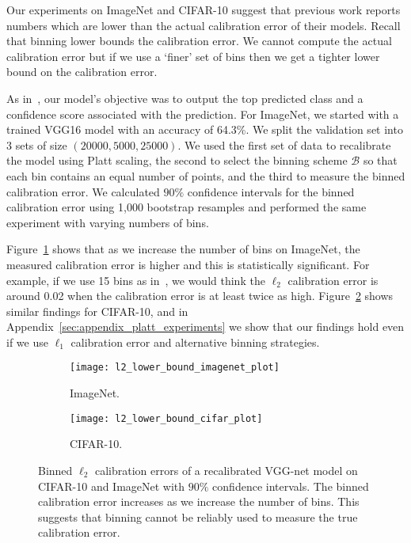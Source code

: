 Our experiments on ImageNet and CIFAR-10 suggest that previous work reports numbers which are lower than the actual calibration error of their models. Recall that binning lower bounds the calibration error. We cannot compute the actual calibration error but if we use a `finer' set of bins then we get a tighter lower bound on the calibration error.

As in~\cite{guo2017calibration}, our model's objective was to output the top predicted class and a confidence score associated with the prediction. For ImageNet, we started with a trained VGG16 model with an accuracy of 64.3\%. We split the validation set into 3 sets of size $(20000, 5000, 25000)$. We used the first set of data to recalibrate the model using Platt scaling, the second to select the binning scheme $\mathcal{B}$ so that each bin contains an equal number of points, and the third to measure the binned calibration error. We calculated $90\%$ confidence intervals for the binned calibration error using 1,000 bootstrap resamples and performed the same experiment with varying numbers of bins.

Figure~\ref{fig:imagenet_lower_bound} shows that as we increase the number of bins on ImageNet, the measured calibration error is higher and this is statistically significant. For example, if we use 15 bins as in~\cite{guo2017calibration}, we would think the $\ell_2$ calibration error is around 0.02 when the calibration error is at least twice as high. Figure~\ref{fig:cifar_10_lower_bound} shows similar findings for CIFAR-10, and in Appendix~\ref{sec:appendix_platt_experiments} we show that our findings hold even if we use $\ell_1$ calibration error and alternative binning strategies.

\begin{figure}
     \centering
     \begin{subfigure}[b]{0.4\textwidth}
         \centering
         \texttt{[image: l2\_lower\_bound\_imagenet\_plot]}
         \caption{ImageNet.}
         \label{fig:imagenet_lower_bound}
     \end{subfigure}
     \hfill
     \begin{subfigure}[b]{0.4\textwidth}
         \centering
         \texttt{[image: l2\_lower\_bound\_cifar\_plot]}
         \caption{CIFAR-10.}
         \label{fig:cifar_10_lower_bound}
     \end{subfigure}
        \caption{
        Binned $\ell_2$ calibration errors of a recalibrated VGG-net model on CIFAR-10 and ImageNet with $90\%$ confidence intervals. The binned calibration error increases as we increase the number of bins. This suggests that binning cannot be reliably used to measure the true calibration error.
        }
        \label{fig:lower_bounds}
\end{figure}


